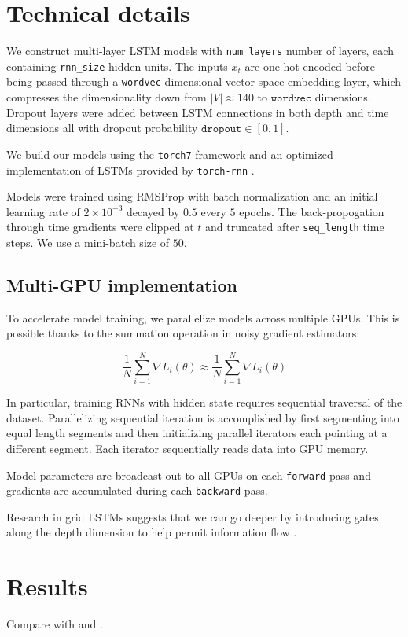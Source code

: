 \documentclass[dissertation.tex]{subfiles}
\begin{document}
\section{Technical details}


We construct multi-layer LSTM models with \texttt{num\_layers} number of
layers, each containing \texttt{rnn\_size} hidden units. The inputs $x_t$ are
one-hot-encoded before being passed through a \texttt{wordvec}-dimensional
vector-space embedding layer, which compresses the dimensionality down from
$|V| \approx 140$ to $\texttt{wordvec}$ dimensions. Dropout layers were added
between LSTM connections in both depth and time dimensions all with dropout
probability $\texttt{dropout} \in [0,1]$.

We build our models using the \texttt{torch7} framework and
an optimized implementation of LSTMs provided by \texttt{torch-rnn} .

Models were trained using RMSProp  with batch normalization 
and an initial learning rate of $2 \times 10^{-3}$ decayed by $0.5$ every $5$
epochs. The back-propogation through time gradients were clipped
at $t$  and truncated after \texttt{seq\_length} time steps.
We use a mini-batch size of $50$.

\subsection{Multi-GPU implementation}

To accelerate model training, we parallelize models across multiple GPUs. This is possible
thanks to the summation operation in noisy gradient estimators:

\begin{equation}
  \frac{1}{N} \sum_{i=1}^N \nabla L_i(\theta) \approx \frac{1}{N} \sum_{i=1}^N \nabla L_i(\theta)
\end{equation}

In particular, training RNNs with hidden state requires sequential traversal
of the dataset. Parallelizing sequential iteration is accomplished by first segmenting
into equal length segments and then initializing parallel iterators each
pointing at a different segment. Each iterator sequentially reads data
into GPU memory.

Model parameters are broadcast out to all GPUs on each \texttt{forward} pass
and gradients are accumulated during each \texttt{backward} pass.

Research in grid LSTMs suggests that we can go deeper by introducing
gates along the depth dimension to help permit information flow .

\section{Results}

Compare with \cite{Allan2005} and \cite{Brien2016}.

\printbibliography
\end{document}
